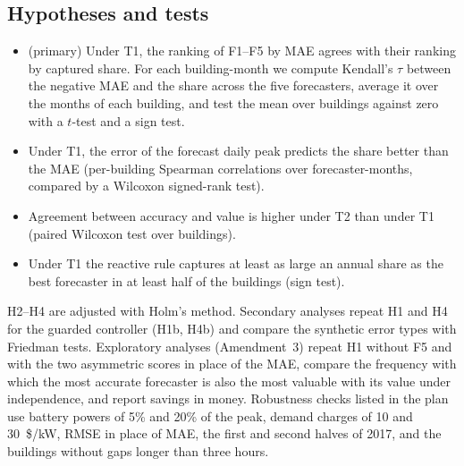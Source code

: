 \subsection{Hypotheses and tests}
\begin{itemize}
\item[H1] (primary) Under T1, the ranking of F1--F5 by MAE agrees with their ranking by captured share. For each building-month we compute Kendall's $\tau$ between the negative MAE and the share across the five forecasters, average it over the months of each building, and test the mean over buildings against zero with a $t$-test and a sign test.
\item[H2] Under T1, the error of the forecast daily peak predicts the share better than the MAE (per-building Spearman correlations over forecaster-months, compared by a Wilcoxon signed-rank test).
\item[H3] Agreement between accuracy and value is higher under T2 than under T1 (paired Wilcoxon test over buildings).
\item[H4] Under T1 the reactive rule captures at least as large an annual share as the best forecaster in at least half of the buildings (sign test).
\end{itemize}
H2--H4 are adjusted with Holm's method. Secondary analyses repeat H1 and H4 for the guarded controller (H1b, H4b) and compare the synthetic error types with Friedman tests. Exploratory analyses (Amendment~3) repeat H1 without F5 and with the two asymmetric scores in place of the MAE, compare the frequency with which the most accurate forecaster is also the most valuable with its value under independence, and report savings in money. Robustness checks listed in the plan use battery powers of 5\% and 20\% of the peak, demand charges of 10 and 30~\$/kW, RMSE in place of MAE, the first and second halves of 2017, and the buildings without gaps longer than three hours.
